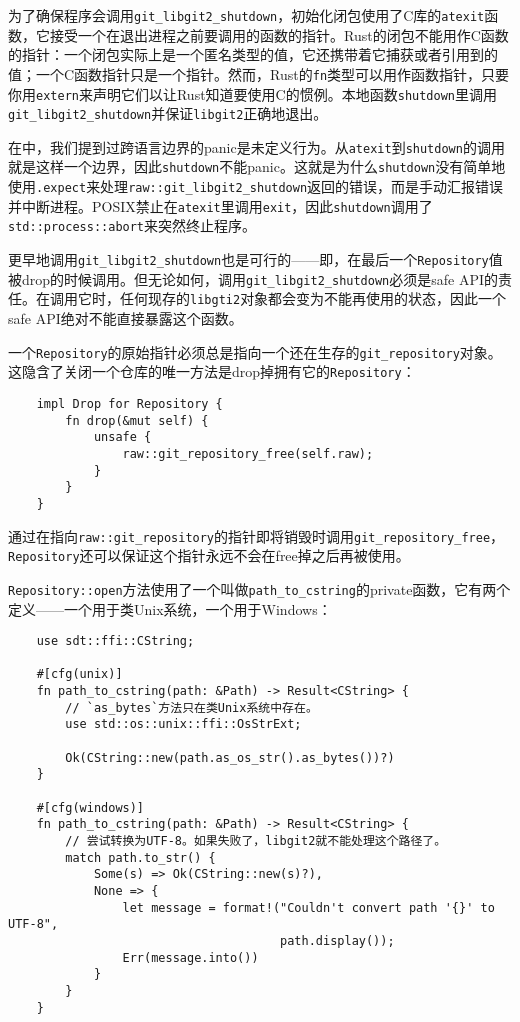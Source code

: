 为了确保程序会调用\texttt{git\_libgit2\_shutdown}，初始化闭包使用了C库的\texttt{atexit}函数，它接受一个在退出进程之前要调用的函数的指针。Rust的闭包不能用作C函数的指针：一个闭包实际上是一个匿名类型的值，它还携带着它捕获或者引用到的值；一个C函数指针只是一个指针。然而，Rust的\texttt{fn}类型可以用作函数指针，只要你用\texttt{extern}来声明它们以让Rust知道要使用C的惯例。本地函数\texttt{shutdown}里调用\texttt{git\_libgit2\_shutdown}并保证\texttt{libgit2}正确地退出。

在中，我们提到过跨语言边界的panic是未定义行为。从\texttt{atexit}到\texttt{shutdown}的调用就是这样一个边界，因此\texttt{shutdown}不能panic。这就是为什么\texttt{shutdown}没有简单地使用\texttt{.expect}来处理\texttt{raw::git\_libgit2\_shutdown}返回的错误，而是手动汇报错误并中断进程。POSIX禁止在\texttt{atexit}里调用\texttt{exit}，因此\texttt{shutdown}调用了\texttt{std::process::abort}来突然终止程序。

更早地调用\texttt{git\_libgit2\_shutdown}也是可行的——即，在最后一个\texttt{Repository}值被drop的时候调用。但无论如何，调用\texttt{git\_libgit2\_shutdown}必须是safe API的责任。在调用它时，任何现存的\texttt{libgti2}对象都会变为不能再使用的状态，因此一个safe API绝对不能直接暴露这个函数。

一个\texttt{Repository}的原始指针必须总是指向一个还在生存的\texttt{git\_repository}对象。这隐含了关闭一个仓库的唯一方法是drop掉拥有它的\texttt{Repository}：
\begin{verbatim}
    impl Drop for Repository {
        fn drop(&mut self) {
            unsafe {
                raw::git_repository_free(self.raw);
            }
        }
    }
\end{verbatim}

通过在指向\texttt{raw::git\_repository}的指针即将销毁时调用\texttt{git\_repository\_free}，\texttt{Repository}还可以保证这个指针永远不会在free掉之后再被使用。

\texttt{Repository::open}方法使用了一个叫做\texttt{path\_to\_cstring}的private函数，它有两个定义——一个用于类Unix系统，一个用于Windows：
\begin{verbatim}
    use sdt::ffi::CString;

    #[cfg(unix)]
    fn path_to_cstring(path: &Path) -> Result<CString> {
        // `as_bytes`方法只在类Unix系统中存在。
        use std::os::unix::ffi::OsStrExt;

        Ok(CString::new(path.as_os_str().as_bytes())?)
    }

    #[cfg(windows)]
    fn path_to_cstring(path: &Path) -> Result<CString> {
        // 尝试转换为UTF-8。如果失败了，libgit2就不能处理这个路径了。
        match path.to_str() {
            Some(s) => Ok(CString::new(s)?),
            None => {
                let message = format!("Couldn't convert path '{}' to UTF-8",
                                      path.display());
                Err(message.into())
            }
        }
    }
\end{verbatim}

